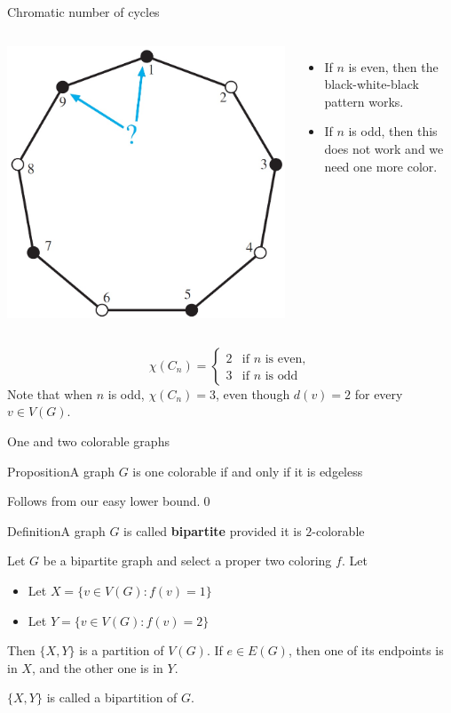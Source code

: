\documentclass{beamer}
\def\bl[#1]#2{\begin{block}{#1}#2\end{block}}
\def\itemb{\begin{itemize}}
\def\iteme{\end{itemize}}
\begin{document}
\begin{frame}{Chromatic number of cycles}
\begin{columns}
\includegraphics[scale=0.23]{CycleChrom.jpg}
\itemb
\item If $n$ is even, then the black-white-black pattern works.
\item If $n$ is odd, then this does not work and we need one more color.
\iteme
\end{columns}\vspace{0.5cm}
\[
\chi(C_n)=\left\{\begin{array}{ll}
2&\textrm{if $n$ is even},\\
3&\textrm{if $n$ is odd}
\end{array}\right.
\]
Note that when $n$ is odd, $\chi(C_n)=3$, even though $d(v)=2$ for every $v\in V(G)$.
\end{frame}

\begin{frame}{One and two colorable graphs}
\bl[Proposition]{A graph $G$ is one colorable if and only if it is edgeless}
Follows from our easy lower bound.\qed
\bl[Definition]{A graph $G$ is called \textbf{bipartite} provided it is $2$-colorable}
Let $G$ be a bipartite graph and select a proper two coloring $f$. Let
\itemb
\item Let $X=\{v\in V(G): f(v)=1\}$
\item Let $Y=\{v\in V(G): f(v)=2\}$
\iteme
Then $\{X,Y\}$ is a partition of $V(G)$. If $e\in E(G)$, then one of its endpoints is in $X$, and the other one is in $Y$.
\bl[]{ $\{X,Y\}$ is called a bipartition of $G$.
}
\end{frame}
\end{document}
